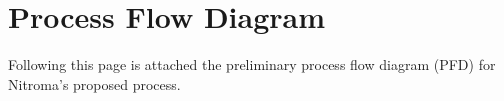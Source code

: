 \section{Process Flow Diagram}
\label{app:PFD}

Following this page is attached the preliminary process flow diagram (PFD) for Nitroma's proposed process.


